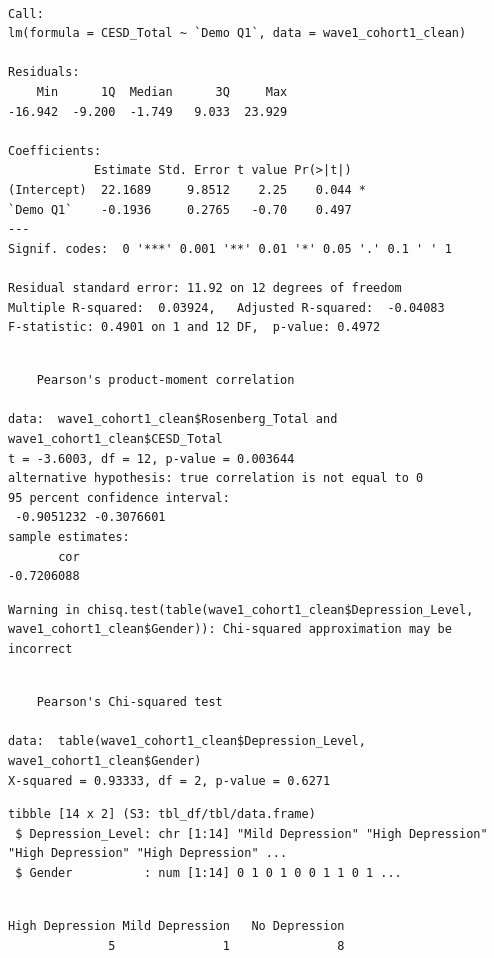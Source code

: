 \documentclass[
]{article}
\begin{document}
\begin{verbatim}

Call:
lm(formula = CESD_Total ~ `Demo Q1`, data = wave1_cohort1_clean)

Residuals:
    Min      1Q  Median      3Q     Max 
-16.942  -9.200  -1.749   9.033  23.929 

Coefficients:
            Estimate Std. Error t value Pr(>|t|)  
(Intercept)  22.1689     9.8512    2.25    0.044 *
`Demo Q1`    -0.1936     0.2765   -0.70    0.497  
---
Signif. codes:  0 '***' 0.001 '**' 0.01 '*' 0.05 '.' 0.1 ' ' 1

Residual standard error: 11.92 on 12 degrees of freedom
Multiple R-squared:  0.03924,   Adjusted R-squared:  -0.04083 
F-statistic: 0.4901 on 1 and 12 DF,  p-value: 0.4972
\end{verbatim}

\begin{verbatim}

    Pearson's product-moment correlation

data:  wave1_cohort1_clean$Rosenberg_Total and wave1_cohort1_clean$CESD_Total
t = -3.6003, df = 12, p-value = 0.003644
alternative hypothesis: true correlation is not equal to 0
95 percent confidence interval:
 -0.9051232 -0.3076601
sample estimates:
       cor 
-0.7206088 
\end{verbatim}

\begin{verbatim}
Warning in chisq.test(table(wave1_cohort1_clean$Depression_Level,
wave1_cohort1_clean$Gender)): Chi-squared approximation may be incorrect
\end{verbatim}

\begin{verbatim}

    Pearson's Chi-squared test

data:  table(wave1_cohort1_clean$Depression_Level, wave1_cohort1_clean$Gender)
X-squared = 0.93333, df = 2, p-value = 0.6271
\end{verbatim}

\begin{verbatim}
tibble [14 x 2] (S3: tbl_df/tbl/data.frame)
 $ Depression_Level: chr [1:14] "Mild Depression" "High Depression" "High Depression" "High Depression" ...
 $ Gender          : num [1:14] 0 1 0 1 0 0 1 1 0 1 ...
\end{verbatim}

\begin{verbatim}

High Depression Mild Depression   No Depression 
              5               1               8 
\end{verbatim}
\end{document}
